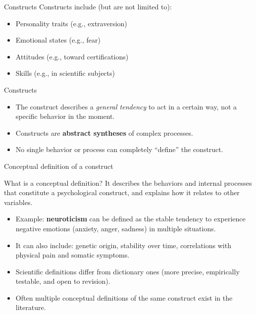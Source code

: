 \documentclass{beamer}
\begin{document}
\begin{frame}{Constructs}
Constructs include (but are not limited to):
    \begin{itemize}
      \item Personality traits (e.g., extraversion)
      \item Emotional states (e.g., fear)
      \item Attitudes (e.g., toward certifications)
      \item Skills (e.g., in scientific subjects)
    \end{itemize}
\end{frame}

\begin{frame}{Constructs}
  \begin{itemize}
    \item The construct describes a \textit{general tendency} to act in a certain way, not a specific behavior in the moment.
    \item Constructs are \textbf{abstract syntheses} of complex processes.
    \item No single behavior or process can completely “define” the construct.
  \end{itemize}
\end{frame}

\begin{frame}{Conceptual definition of a construct}
  \begin{block}{What is a conceptual definition?}
    It describes the behaviors and internal processes that constitute a psychological construct, and explains how it relates to other variables.
  \end{block}
  \pause
  \begin{itemize}
    \item Example: \textbf{neuroticism} can be defined as the stable tendency to experience negative emotions (anxiety, anger, sadness) in multiple situations.
    \item It can also include: genetic origin, stability over time, correlations with physical pain and somatic symptoms.
    \pause
    \item Scientific definitions differ from dictionary ones (more precise, empirically testable, and open to revision).
    \item Often multiple conceptual definitions of the same construct exist in the literature.
  \end{itemize}
\end{frame}
\end{document}
